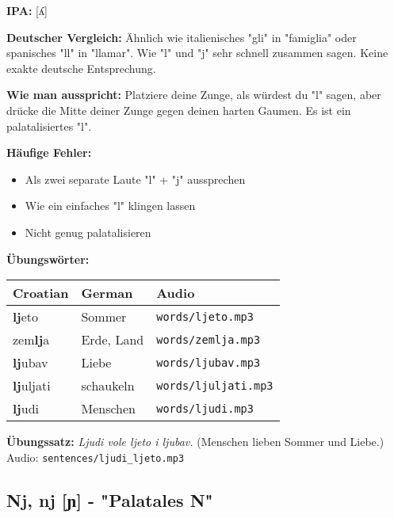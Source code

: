 \begin{tcolorbox}[colback=lightgreen!30, colframe=green!60!black, title=\textbf{Lj, lj}]

\textbf{IPA:} [ʎ]

\textbf{Deutscher Vergleich:}
Ähnlich wie italienisches "gli" in "famiglia" oder spanisches "ll" in "llamar". Wie "l" und "j" sehr schnell zusammen sagen. Keine exakte deutsche Entsprechung.

\textbf{Wie man ausspricht:}
Platziere deine Zunge, als würdest du "l" sagen, aber drücke die Mitte deiner Zunge gegen deinen harten Gaumen. Es ist ein palatalisiertes "l".

\textbf{Häufige Fehler:}
\begin{itemize}
    \item Als zwei separate Laute "l" + "j" aussprechen
    \item Wie ein einfaches "l" klingen lassen
    \item Nicht genug palatalisieren
\end{itemize}

\textbf{Übungswörter:}
\begin{tabular}{lll}
\textbf{Croatian} & \textbf{German} & \textbf{Audio} \\
\midrule
\textbf{lj}eto & Sommer & \texttt{words/ljeto.mp3} \\
zem\textbf{lj}a & Erde, Land & \texttt{words/zemlja.mp3} \\
\textbf{lj}ubav & Liebe & \texttt{words/ljubav.mp3} \\
\textbf{lj}uljati & schaukeln & \texttt{words/ljuljati.mp3} \\
\textbf{lj}udi & Menschen & \texttt{words/ljudi.mp3} \\
\end{tabular}

\textbf{Übungssatz:}
\textit{Ljudi vole ljeto i ljubav.}
(Menschen lieben Sommer und Liebe.)
Audio: \texttt{sentences/ljudi\_ljeto.mp3}

\end{tcolorbox}

\subsection{Nj, nj [ɲ] - "Palatales N"}

